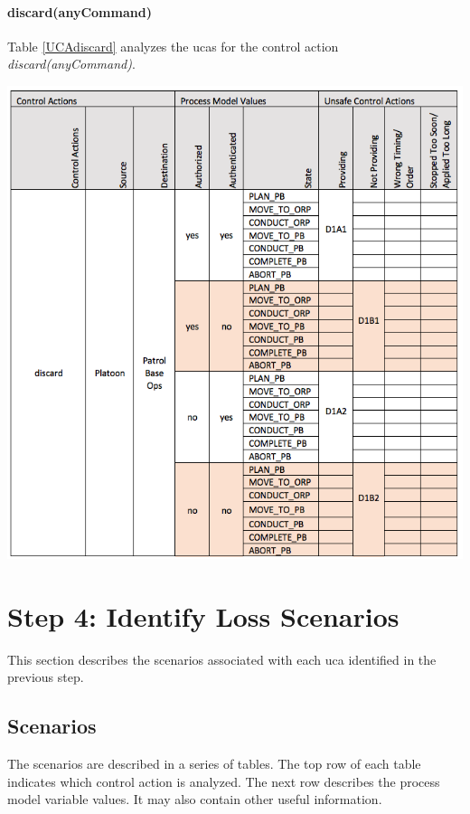 \documentclass[../../main/main.tex]{subfiles}
\begin{document}
\paragraph*{discard(anyCommand)}
Table \ref{UCAdiscard} analyzes the \glspl{uca} for the control action \textit{discard(anyCommand)}.
\begin{table}[ht!]
\begin{center}
\includegraphics[width=\linewidth]{../figures/ucadiscards}
\caption{Unsafe control actions \glspl{uca} for control action "discard(anyCommand)."}
\label{UCAdiscard}
\end{center}
\end{table}
\clearpage
\section{Step 4: Identify Loss Scenarios}\label{chp:stpapb:scenarios}
This section describes the scenarios associated with each \gls{uca} identified in the previous step. 

\subsection{Scenarios}
The scenarios are described in a series of tables.  The top row of each table indicates which control action is analyzed.  The next row describes the process model variable values.  It may also contain other useful information.
\end{document}
